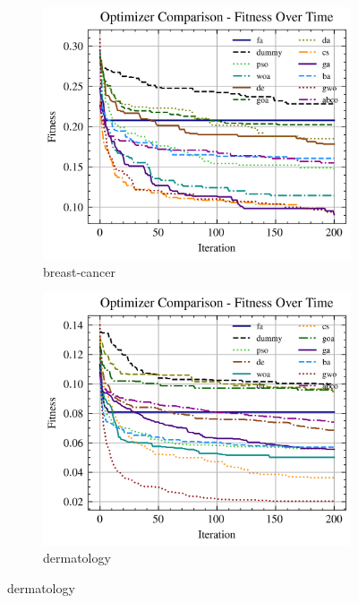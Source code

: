 \begin{figure}[htp]
    \centering
    \begin{subfigure}[htp]{0.45\textwidth}
        \includegraphics[width=\textwidth]{imagenes/fitness_charts/img/real/breast-cancer/optimizers_fitness_knn.png}
        \caption{breast-cancer}
    \end{subfigure}
    \begin{subfigure}[htp]{0.45\textwidth}
        \includegraphics[width=\textwidth]{imagenes/fitness_charts/img/real/dermatology/optimizers_fitness_knn.png}
        \caption{dermatology}

\end{subfigure}
\end{figure}
